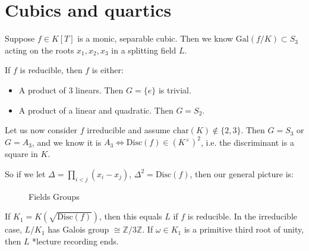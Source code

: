 \documentclass{article}
\theoremstyle{definition}
\begin{document}
\section{Cubics and quartics}

Suppose $f \in K[T]$ is a monic, separable cubic. Then we know $\text{Gal}(f/K) \subset S_3$ acting on the roots $x_1,x_2,x_3$ in a splitting field $L$.
\vspace{1mm}

If $f$ is reducible, then $f$ is either:
\begin{itemize}
    \item A product of 3 linears. Then $G = \{e\}$ is trivial.
    \item A product of a linear and quadratic. Then $G=S_2$.
\end{itemize}
Let us now consider $f$ irreducible and assume $\text{char}(K) \not\in \{2,3\}$. Then $G=S_3$ or $G=A_3$, and we know it is $A_3 \iff \text{Disc}(f) \in (K^\times)^2$, i.e. the discriminant is a square in $K$.
\vspace{1mm}

So if we let $\Delta=\prod_{i<j}^{} (x_i-x_j)$, $\Delta^2=\text{Disc}(f)$, then our general picture is:

\begin{figure}[H]
    \centering
    \captionsetup{labelformat=empty}
\caption{\hspace{6mm} Fields \hspace{35mm} Groups}
\end{figure}

If $K_1 = K(\sqrt{\text{Disc}(f)})$, then this equals $L$ if $f$ is reducible. In the irreducible case, $L/K_1$ has Galois group $\cong \mathbb{Z}/3\mathbb{Z}$. If $\omega \in K_1$ is a primitive third root of unity, then $L$ *lecture recording ends.
\end{document}
